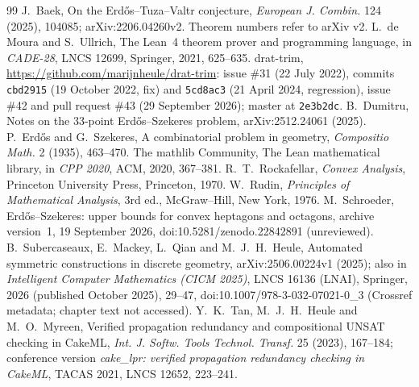 \begin{thebibliography}{99}\small
\setlength{\itemsep}{1pt}\setlength{\parsep}{0pt}
 J.~Baek, On the Erd\H{o}s--Tuza--Valtr conjecture, \emph{European J. Combin.} 124 (2025), 104085;
arXiv:2206.04260v2. Theorem numbers refer to arXiv v2.
 L.~de Moura and S.~Ullrich, The Lean~4 theorem prover and programming language, in \emph{CADE-28},
LNCS 12699, Springer, 2021, 625--635.
 drat-trim, \url{https://github.com/marijnheule/drat-trim}: issue \#31 (22 July 2022), commits
\texttt{cbd2915} (19 October 2022, fix) and \texttt{5cd8ac3} (21 April 2024, regression), issue \#42 and pull request
\#43 (29 September 2026); master at \texttt{2e3b2dc}.
 B.~Dumitru, Notes on the 33-point Erd\H{o}s--Szekeres problem, arXiv:2512.24061 (2025).
 P.~Erd\H{o}s and G.~Szekeres, A combinatorial problem in geometry, \emph{Compositio Math.} 2 (1935),
463--470.
 The mathlib Community, The Lean mathematical library, in \emph{CPP 2020}, ACM, 2020, 367--381.
 R.~T.~Rockafellar, \emph{Convex Analysis}, Princeton University Press, Princeton, 1970.
 W.~Rudin, \emph{Principles of Mathematical Analysis}, 3rd ed., McGraw--Hill, New York, 1976.
 M.~Schroeder, Erd\H{o}s--Szekeres: upper bounds for convex heptagons and octagons, archive version~1,
19 September 2026, doi:10.5281/zenodo.22842891 (unreviewed).
 B.~Subercaseaux, E.~Mackey, L.~Qian and M.~J.~H.~Heule, Automated symmetric constructions in discrete
geometry, arXiv:2506.00224v1 (2025); also in \emph{Intelligent Computer Mathematics (CICM 2025)}, LNCS 16136 (LNAI),
Springer, 2026 (published October 2025), 29--47,
doi:10.1007/978-3-032-07021-0\_3 (Crossref metadata; chapter text not accessed).
 Y.~K.~Tan, M.~J.~H.~Heule and M.~O.~Myreen, Verified propagation redundancy and compositional UNSAT
checking in CakeML, \emph{Int. J. Softw. Tools Technol. Transf.} 25 (2023), 167--184; conference version
\emph{cake\_lpr: verified propagation redundancy checking in CakeML}, TACAS 2021, LNCS 12652, 223--241.
\end{thebibliography}
